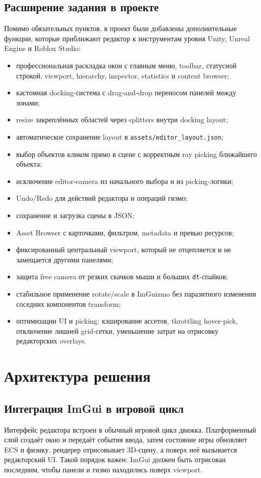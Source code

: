 \documentclass[a4paper,14pt]{extarticle}
\DeclareRobustCommand{\code}[1]{\nolinkurl{#1}}
\begin{document}
\subsection{Расширение задания в проекте}
Помимо обязательных пунктов, в проект были добавлены дополнительные функции, которые приближают редактор к инструментам уровня Unity, Unreal Engine и Roblox Studio:
\begin{itemize}
  \item профессиональная раскладка окон с главным меню, toolbar, статусной строкой, viewport, hierarchy, inspector, statistics и content browser;
  \item кастомная docking-система с drag-and-drop переносом панелей между зонами;
  \item resize закреплённых областей через splitters внутри docking layout;
  \item автоматическое сохранение layout в \code{assets/editor_layout.json};
  \item выбор объектов кликом прямо в сцене с корректным ray picking ближайшего объекта;
  \item исключение editor-camera из начального выбора и из picking-логики;
  \item Undo/Redo для действий редактора и операций гизмо;
  \item сохранение и загрузка сцены в JSON;
  \item Asset Browser с карточками, фильтром, metadata и превью ресурсов;
  \item фиксированный центральный viewport, который не отцепляется и не замещается другими панелями;
  \item защита free camera от резких скачков мыши и больших \texttt{dt}-спайков;
  \item стабильное применение rotate/scale в ImGuizmo без паразитного изменения соседних компонентов transform;
  \item оптимизации UI и picking: кэширование ассетов, throttling hover-pick, отключение лишней grid-сетки, уменьшение затрат на отрисовку редакторских overlays.
\end{itemize}

\section{Архитектура решения}
\subsection{Интеграция ImGui в игровой цикл}
Интерфейс редактора встроен в обычный игровой цикл движка. Платформенный слой создаёт окно и передаёт события ввода, затем состояние игры обновляет ECS и физику, рендерер отрисовывает 3D-сцену, а поверх неё вызывается редакторский UI. Такой порядок важен: ImGui должен быть отрисован последним, чтобы панели и гизмо находились поверх viewport.
\end{document}

